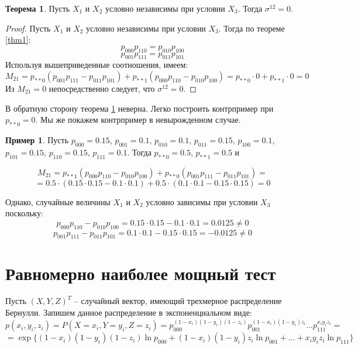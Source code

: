 \documentclass{article}
\theoremstyle{definition}
\newtheorem{theorem}{Теорема}[section]
\newtheorem{example}{Пример}[section]
\begin{document}
\begin{theorem}\label{1.2}
    Пусть $X_1$ и $X_2$ условно независимы при условии $X_3$. Тогда $\sigma^{12}=0$.
\end{theorem}
\begin{proof}
    Пусть $X_1$ и $X_2$ условно независимы при условии $X_3$. Тогда по теореме \ref{thm1}:
    $$p_{000}p_{110}=p_{010}p_{100}$$
    $$p_{001}p_{111}=p_{011}p_{101}$$
    Используя вышеприведенные соотношения, имеем:
    $$
        M_{21} = p_{**0}(p_{001}p_{111}-p_{011}p_{101}) + p_{**1} (p_{000}p_{110}-p_{010}p_{100})=p_{**0}\cdot 0 + p_{**1} \cdot 0 = 0
    $$
    Из $M_{21}=0$ непосредственно следует, что $\sigma^{12}=0$.
\end{proof}
В обратную сторону теорема \ref{1.2} неверна. Легко построить контрпример при $p_{**0}=0$. Мы же покажем контрпример в невырожденном случае.
\begin{example}
    Пусть $p_{000}=0.15$, $p_{001}=0.1$, $p_{010}=0.1$, $p_{011}=0.15$, $p_{100}=0.1$, $p_{101}=0.15$, $p_{110}=0.15$, $p_{111}=0.1$.
    Тогда $p_{**0}=0.5$, $p_{**1}=0.5$ и

    $$M_{21} = p_{**1}(p_{000}p_{110}-p_{010}p_{100}) + p_{**0}(p_{001}p_{111}-p_{011}p_{101})=$$
    $$= 0.5 \cdot (0.15 \cdot 0.15 - 0.1 \cdot 0.1) + 0.5 \cdot (0.1 \cdot 0.1 - 0.15 \cdot 0.15) = 0$$

    Однако, случайные величины $X_1$ и $X_2$ условно зависимы при условии $X_3$ поскольку:
    $$
        p_{000}p_{110}-p_{010}p_{100}=0.15 \cdot 0.15 - 0.1 \cdot 0.1 = 0.0125 \neq 0
    $$
    $$
        p_{001}p_{111}-p_{011}p_{101}=0.1 \cdot 0.1 - 0.15 \cdot 0.15 = -0.0125 \neq 0
    $$
\end{example}
\section{Равномерно наиболее мощный тест}
Пусть $(X,Y,Z)^T$ -- случайный вектор, имеющий трехмерное распределение Бернулли.
Запишем данное распределение в экспоненциальном виде:
$$p(x_i,y_i,z_i)=P(X=x_i,Y=y_i,Z=z_i)=p_{000}^{(1-x_i)(1-y_i)(1-z_i)} p_{001}^{(1-x_i)(1-y_i)z_i}\ldots p_{111}^{x_i y_i z_i}=$$
$$=\exp\{(1-x_i)(1-y_i)(1-z_i) \ln p_{000} + (1-x_i)(1-y_i)z_i \ln p_{001} + \ldots + x_i y_i z_i \ln p_{111}\}$$
\end{document}
